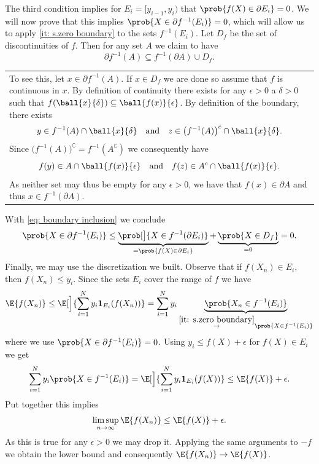 \begin{myproof}
    The third condition implies for \(E_i = [y_{i-1}, y_i)\) that
    \(\prob{f(X) \in \partial E_i} = 0\). We will now prove that this
    implies \(\prob{X \in \partial f^{-1}(E_i)} = 0\), which will
    allow us to apply \ref{it: s.zero boundary} to the sets \(f^{-1}(E_i)\).
    Let \(D_f\) be the set of discontinuities of \(f\). Then for any set \(A\)
    we claim to have
    \begin{equation}
        \label{eq: boundary inclusion}    
        \partial f^{-1}(A) \subseteq f^{-1}(\partial A) \cup D_f.
    \end{equation}
    \begin{center}
    \begin{tabular}{|p{}}
    To see this, let \(x \in \partial f^{-1}(A)\). If \(x\in D_f\) we are done
    so assume that \(f\) is continuous in \(x\). By definition of continuity
    there exists for any \(\epsilon > 0\) a \(\delta > 0\) such that
    \(f(\ball{x}{\delta}) \subseteq \ball{f(x)}{\epsilon}\). By definition of
    the boundary, there exists
    \[
        y \in f^{-1}(A) \cap \ball{x}{\delta}
        \quad \text{and}\quad
        z \in \bigl(f^{-1}(A)\bigr)^\complement \cap \ball{x}{\delta}.
    \]
    Since \(\bigl(f^{-1}(A)\bigr)^\complement = f^{-1}(A^\complement)\) we consequently
    have
    \[
        f(y) \in A \cap \ball{f(x)}{\epsilon}
        \quad \text{and}\quad
        f(z) \in A^\complement \cap \ball{f(x)}{\epsilon}.
    \]
    As neither set may thus be empty for any \(\epsilon > 0\), we have that
    \(f(x) \in \partial A\) and thus \(x \in f^{-1}(\partial A)\).
    \end{tabular}
    \end{center}
    With \eqref{eq: boundary inclusion} we conclude
    \[
        \prob{ X \in \partial f^{-1}(E_i)}
        \le \underbrace{\prob[\big]{X \in f^{-1}(\partial E_i)}}_{=\prob{f(X) \in \partial E_i}} + \underbrace{\prob{X \in D_f}}_{=0} = 0.
    \]
    Finally, we may use the discretization we built. Observe that if \(f(X_n)
    \in E_i\), then \(f(X_n) \le y_i\). Since the sets \(E_i\) cover
    the range of \(f\) we have
    \[
        \E{f(X_n)}
        \le \E[\Big]{\sum_{i=1}^N y_i \ind{E_i}(f(X_n))}
        = \sum_{i=1}^N y_i \underbrace{\prob{X_n \in f^{-1}(E_i)}}_{\overset{\ref{it: s.zero boundary}}\to \prob{X \in f^{-1}(E_i)}}
    \]
    where we use \(\prob{X \in \partial f^{-1}(E_i)} = 0\). Using \(y_i \le f(X) +
    \epsilon\) for \(f(X) \in E_i\) we get
    \[
        \sum_{i=1}^N y_i \prob{X \in f^{-1}(E_i)}
        = \E[\Big]{\sum_{i=1}^N y_i \ind{E_i}(f(X))}
        \le \E{f(X)} + \epsilon.
    \]
    Put together this implies
    \[
        \limsup_{n\to \infty} \E{f(X_n)}
        \le \E{f(X)} + \epsilon.
    \]
    As this is true for any \(\epsilon >0\) we may drop it. Applying the same
    arguments to \(-f\) we obtain the lower bound and consequently
    \(\E{f(X_n)} \to \E{f(X)}\).


\end{myproof}
